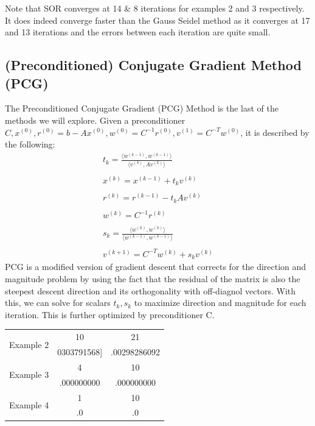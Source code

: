 \documentclass[11pt]{article}	%
\begin{document}
Note that SOR converges at 14 \& 8 iterations for examples 2 and 3 respectively. It does indeed converge faster than the Gauss Seidel method as it converges at 17 and 13 iterations and the errors between each iteration are quite small.


\subsection{(Preconditioned) Conjugate Gradient Method (PCG)}
The Preconditioned Conjugate Gradient (PCG) Method is the last of the methods we will explore. Given a preconditioner $C, x^{(0)}, r^{(0)} = b - Ax^{(0)}, w^{(0)} = C^{-1}r^{(0)}, v^{(1)} = C^{-T}w^{(0)}$, it is described by the following:
\begin{align*}\label{eq:precondition-conj-grad-eq-1}
    t_k = \frac{\langle w^{(k-1)}, w^{(k-1)}\rangle}{\langle v^{(k)}, Av^{(k)}\rangle} \\\\
    x^{(k)} = x^{(k-1)} + t_kv^{(k)} \\\\
    r^{(k)} = r^{(k-1)} - t_kAv^{(k)} \\\\
    w^{(k)} = C^{-1}r^{(k)} \\\\
    s_k = \frac{\langle w^{(k)}, w^{(k)}\rangle}{\langle w^{(k-1)}, w^{(k-1)}\rangle} \\\\
    v^{(k+1)} = C^{-T}w^{(k)} + s_kv^{(k)}
\end{align*}
PCG is a modified version of gradient descent that corrects for the direction and magnitude problem by using the fact that the residual of the matrix is also the steepest descent direction and its orthogonality with off-diagnol vectors. With this, we can solve for scalars $t_k, s_k$ to maximize direction and magnitude for each iteration. This is further optimized by preconditioner C.

\begin{center}
	 \label{tab:title}
    \begin{tabular}{||c|c|c||}
        \hline
        \multirow{2}{5em}{Example 2} & 10 & 21 \\ [.25em]
        & 0303791568] & .00298286092\\ [.25em]
        \hline\hline
        \multirow{2}{5em}{Example 3} & 4 & 10 \\ [.25em]
        & .000000000 & .000000000 \\ [.25em]
        \hline
        \multirow{2}{5em}{Example 4} & 1 & 10 \\ [.25em]
        & .0 & .0 \\ [.25em]
        \hline
    \end{tabular}
\end{center}
\end{document}
